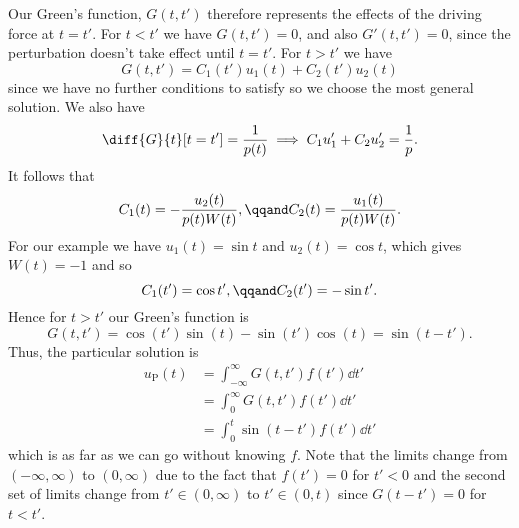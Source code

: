 \documentclass[fleqn]{NotesClass}
\begin{document}
    Our Green's function, \(G(t, t')\) therefore represents the effects of the driving force at \(t = t'\).
    For \(t < t'\) we have \(G(t, t') = 0\), and also \(G'(t, t') = 0\), since the perturbation doesn't take effect until \(t = t'\).
    For \(t > t'\) we have
    \begin{equation}
        G(t, t') = C_1(t')u_1(t) + C_2(t')u_2(t)
    \end{equation}
    since we have no further conditions to satisfy so we choose the most general solution.
    We also have
    \begin{equation}
        \diff{G}{t}[t=t'] = \frac{1}{p(t)} \implies C_1u_1' + C_2u_2' = \frac{1}{p}.
    \end{equation}
    It follows that
    \begin{equation}
        C_1(t) = -\frac{u_2(t)}{p(t) W(t)}, \qqand C_2(t) = \frac{u_1(t)}{p(t)W(t)}.
    \end{equation}
    For our example we have \(u_1(t) = \sin t\) and \(u_2(t) = \cos t\), which gives \(W(t) = -1\) and so
    \begin{equation}
        C_1(t')= \cos t', \qqand C_2(t') = -\sin t'.
    \end{equation}
    Hence for \(t > t'\) our Green's function is
    \begin{equation}
        G(t, t') = \cos(t')\sin(t) - \sin(t')\cos(t) = \sin(t - t').
    \end{equation}
    Thus, the particular solution is
    \begin{align}
        u_{\mathrm{P}}(t) &= \int_{-\infty}^{\infty} G(t, t') f(t') \dd{t'}\\
        &= \int_{0}^{\infty} G(t, t')f(t') \dd{t'}\\
        &= \int_{0}^{t} \sin(t - t') f(t') \dd{t'}\label{eqn:driven shm solution}
    \end{align}
    which is as far as we can go without knowing \(f\).
    Note that the limits change from \((-\infty, \infty)\) to \((0, \infty)\) due to the fact that \(f(t') = 0\) for \(t' < 0\) and the second set of limits change from \(t' \in (0, \infty)\) to \(t' \in (0, t)\) since \(G(t - t') = 0\) for \(t < t'\).
    
\end{document}
